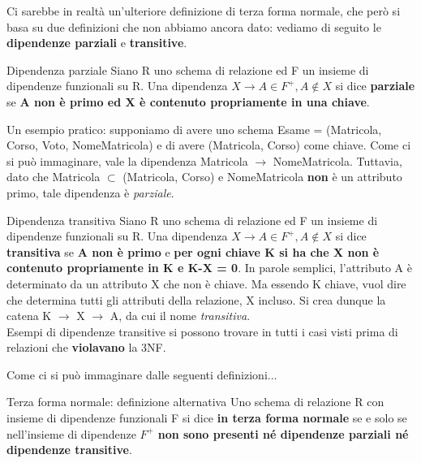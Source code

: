 \documentclass[12pt]{report}
\newcommand{\ra}{
	\rightarrow
}
\begin{document}
	Ci sarebbe in realtà un'ulteriore definizione di terza forma normale, che però si basa su due definizioni che non abbiamo ancora dato: vediamo di seguito le \textbf{dipendenze parziali} e \textbf{transitive}.
	\begin{definizione}{Dipendenza parziale}{}
		Siano R uno schema di relazione ed F un insieme di dipendenze funzionali su R. Una dipendenza $X \ra A \in F^+, A \notin X$ si dice \textbf{parziale} se \textbf{A non è primo ed X è contenuto propriamente in una chiave}.
		\smallbreak
		
		Un esempio pratico: supponiamo di avere uno schema Esame = (Matricola, Corso, Voto, NomeMatricola) e di avere (Matricola, Corso) come chiave. Come ci si può immaginare, vale la dipendenza Matricola $\ra$ NomeMatricola. Tuttavia, dato che Matricola $\subset$ (Matricola, Corso) e NomeMatricola \textbf{non} è un attributo primo, tale dipendenza è \textit{parziale}.
	\end{definizione}
	
	\begin{definizione}{Dipendenza transitiva}{}
		Siano R uno schema di relazione ed F un insieme di dipendenze funzionali su R. Una dipendenza $X \ra A \in F^+, A \notin X$ si dice \textbf{transitiva} se \textbf{A non è primo} e \textbf{per ogni chiave K si ha che X non è contenuto propriamente in K e K-X = 0}. In parole semplici, l'attributo A è determinato da un attributo X che non è chiave. Ma essendo K chiave, vuol dire che determina tutti gli attributi della relazione, X incluso. Si crea dunque la catena K $\ra$ X $\ra$ A, da cui il nome \textit{transitiva}.\\
		Esempi di dipendenze transitive si possono trovare in tutti i casi visti prima di relazioni che \textbf{violavano} la 3NF.
	\end{definizione}
	
	Come ci si può immaginare dalle seguenti definizioni...
	\begin{definizione}{Terza forma normale: definizione alternativa}{}
		Uno schema di relazione R con insieme di dipendenze funzionali F si dice \textbf{in terza forma normale} se e solo se nell'insieme di dipendenze $F^+$ \textbf{non sono presenti né dipendenze parziali né dipendenze transitive}.
	\end{definizione}
	
\end{document}
